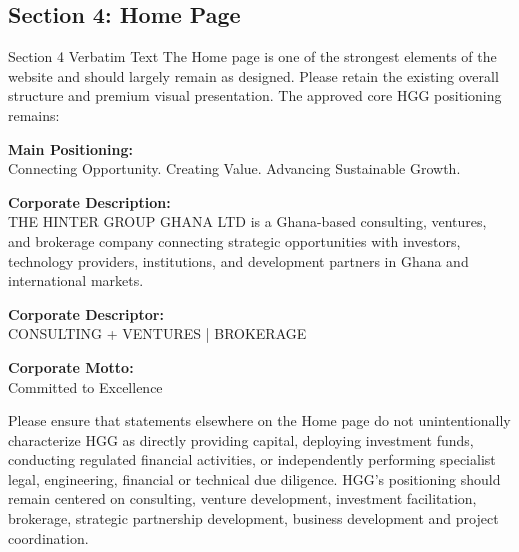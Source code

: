 \documentclass[11pt,a4paper]{article}
\begin{document}
\vspace{0.3cm}

\subsection{Section 4: Home Page}

\begin{VerbatimClientBox}{Section 4 Verbatim Text}
The Home page is one of the strongest elements of the website and should largely remain as designed.
Please retain the existing overall structure and premium visual presentation.
The approved core HGG positioning remains:

\textbf{Main Positioning:} \\
Connecting Opportunity. Creating Value. Advancing Sustainable Growth.

\textbf{Corporate Description:} \\
THE HINTER GROUP GHANA LTD is a Ghana-based consulting, ventures, and brokerage company connecting strategic opportunities with investors, technology providers, institutions, and development partners in Ghana and international markets.

\textbf{Corporate Descriptor:} \\
CONSULTING + VENTURES | BROKERAGE

\textbf{Corporate Motto:} \\
Committed to Excellence

Please ensure that statements elsewhere on the Home page do not unintentionally characterize HGG as directly providing capital, deploying investment funds, conducting regulated financial activities, or independently performing specialist legal, engineering, financial or technical due diligence.
HGG's positioning should remain centered on consulting, venture development, investment facilitation, brokerage, strategic partnership development, business development and project coordination.
\end{VerbatimClientBox}
\end{document}
